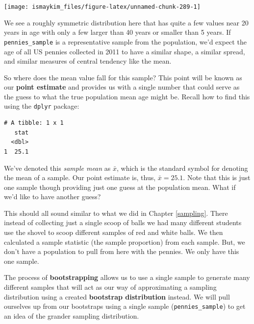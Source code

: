 \documentclass[12pt,]{krantz}
\makeatletter
\newenvironment{Shaded}{\begin{snugshade}}{\end{snugshade}}
\newcommand{\KeywordTok}[1]{\textcolor[rgb]{0.27,0.27,0.27}{\textbf{#1}}}
\newcommand{\DataTypeTok}[1]{\textcolor[rgb]{0.27,0.27,0.27}{#1}}
\newcommand{\DecValTok}[1]{\textcolor[rgb]{0.06,0.06,0.06}{#1}}
\newcommand{\StringTok}[1]{\textcolor[rgb]{0.5,0.5,0.5}{#1}}
\newcommand{\OperatorTok}[1]{\textcolor[rgb]{0.43,0.43,0.43}{\textbf{#1}}}
\newcommand{\NormalTok}[1]{#1}
\newenvironment{kframe}{%
\medskip{}
\setlength{\fboxsep}{.8em}
 \def\at@end@of@kframe{}%
 \ifinner\ifhmode%
  \def\at@end@of@kframe{\end{minipage}}%
  \begin{minipage}{\columnwidth}%
 \fi\fi%
 \def\FrameCommand##1{\hskip\@totalleftmargin \hskip-\fboxsep
 \colorbox{shadecolor}{##1}\hskip-\fboxsep
     \hskip-\linewidth \hskip-\@totalleftmargin \hskip\columnwidth}%
 \MakeFramed {\advance\hsize-\width
   \@totalleftmargin\z@ \linewidth\hsize
   \@setminipage}}%
 {\par\unskip\endMakeFramed%
 \at@end@of@kframe}
\renewenvironment{Shaded}{\begin{kframe}}{\end{kframe}}
\theoremstyle{definition}
\theoremstyle{definition}
\theoremstyle{definition}
\theoremstyle{remark}
\makeatother
\begin{document}
\begin{center}\texttt{[image: ismaykim\_files/figure-latex/unnamed-chunk-289-1]} \end{center}

We see a roughly symmetric distribution here that has quite a few values
near 20 years in age with only a few larger than 40 years or smaller
than 5 years. If \texttt{pennies\_sample} is a representative sample
from the population, we'd expect the age of all US pennies collected in
2011 to have a similar shape, a similar spread, and similar measures of
central tendency like the mean.

So where does the mean value fall for this sample? This point will be
known as our \textbf{point estimate} and provides us with a single
number that could serve as the guess to what the true population mean
age might be. Recall how to find this using the \texttt{dplyr} package:

\begin{Shaded}
\end{Shaded}

\begin{verbatim}
# A tibble: 1 x 1
   stat
  <dbl>
1  25.1
\end{verbatim}

We've denoted this \emph{sample mean} as \(\bar{x}\), which is the
standard symbol for denoting the mean of a sample. Our point estimate
is, thus, \(\bar{x} = 25.1\). Note that this is just one sample though
providing just one guess at the population mean. What if we'd like to
have another guess?

This should all sound similar to what we did in Chapter \ref{sampling}.
There instead of collecting just a single scoop of balls we had many
different students use the shovel to scoop different samples of red and
white balls. We then calculated a sample statistic (the sample
proportion) from each sample. But, we don't have a population to pull
from here with the pennies. We only have this one sample.

The process of \textbf{bootstrapping} allows us to use a single sample
to generate many different samples that will act as our way of
approximating a sampling distribution using a created \textbf{bootstrap
distribution} instead. We will pull ourselves up from our bootstraps
using a single sample (\texttt{pennies\_sample}) to get an idea of the
grander sampling distribution.
\end{document}
